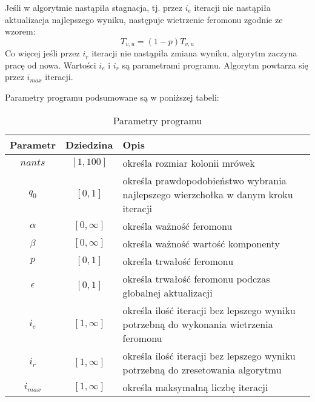 \documentclass[11pt]{article}
\begin{document}
 Jeśli w algorytmie nastąpiła stagnacja, tj. przez $i_e$ iteracji nie nastąpiła aktualizacja najlepszego wyniku, następuje wietrzenie feromonu zgodnie ze wzorem:
\begin{equation}
T_{v,u} = (1 - p) T_{v,u}
\end{equation}
Co więcej jeśli przez $i_r$ iteracji nie nastąpiła zmiana wyniku, algorytm zaczyna pracę od nowa. Wartości $i_e$ i $i_r$ są parametrami programu.
Algorytm powtarza się przez $i_{max}$ iteracji.

Parametry programu podsumowane są w poniższej tabeli:
\begin{table}[h!]
	\centering
    \label{tab:table4}
    \begin{tabular}{|c|c|P{8cm}|}
    	\hline
		Parametr & Dziedzina & Opis  \\ \hline \hline
		$nants$ & $[1, 100]$ & określa rozmiar kolonii mrówek\\ \hline
		$q_0$ & $[0, 1]$ & określa prawdopodobieństwo wybrania najlepszego wierzchołka w danym kroku iteracji\\ \hline
		$\alpha$ & $[0, \infty]$ & określa ważność feromonu \\ \hline
		$\beta$ & $[0, \infty]$ & określa ważność wartość komponenty \\ \hline
		$p$ & $[0, 1]$ & określa trwałość feromonu \\ \hline
		$\epsilon$ & $[0, 1]$ & określa trwałość feromonu podczas globalnej aktualizacji \\ \hline
		$i_e$ & $[1, \infty]$ & określa ilość iteracji bez lepszego wyniku potrzebną do wykonania wietrzenia feromonu \\ \hline
		$i_r$ & $[1, \infty]$ & określa ilość iteracji bez lepszego wyniku potrzebną do zresetowania algorytmu\\ \hline
		$i_{max}$ & $[1, \infty]$ & określa maksymalną liczbę iteracji\\ \hline
    \end{tabular}
	\caption{Parametry programu}
\end{table}
\end{document}

